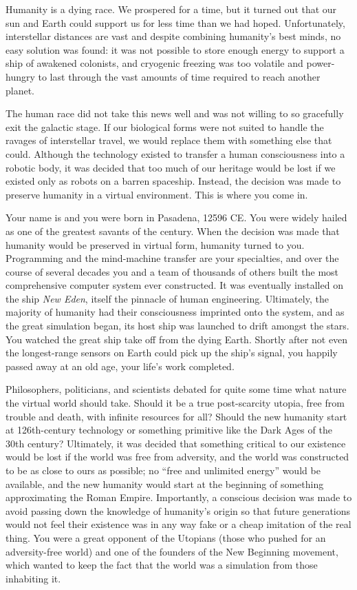 \documentclass[char]{guildcamp1}
\begin{document}
\name{\cProgrammer{}}

Humanity is a dying race. We prospered for a time, but it turned out that our sun and Earth could support us for less time than we had hoped. Unfortunately, interstellar distances are vast and despite combining humanity's best minds, no easy solution was found: it was not possible to store enough energy to support a ship of awakened colonists, and cryogenic freezing was too volatile and power-hungry to last through the vast amounts of time required to reach another planet.

The human race did not take this news well and was not willing to so gracefully exit the galactic stage. If our biological forms were not suited to handle the ravages of interstellar travel, we would replace them with something else that could. Although the technology existed to transfer a human consciousness into a robotic body, it was decided that too much of our heritage would be lost if we existed only as robots on a barren spaceship. Instead, the decision was made to preserve humanity in a virtual environment. This is where you come in.

Your name is \cProgrammer{\intro} and you were born in Pasadena, 12596 CE. You were widely hailed as one of the greatest savants of the century. When the decision was made that humanity would be preserved in virtual form, humanity turned to you. Programming and the mind-machine transfer are your specialties, and over the course of several decades you and a team of thousands of others built the most comprehensive computer system ever constructed. It was eventually installed on the ship \emph{New Eden}, itself the pinnacle of human engineering. Ultimately, the majority of humanity had their consciousness imprinted onto the system, and as the great simulation began, its host ship was launched to drift amongst the stars. You watched the great ship take off from the dying Earth. Shortly after not even the longest-range sensors on Earth could pick up the ship's signal, you happily passed away at an old age, your life's work completed.

Philosophers, politicians, and scientists debated for quite some time what nature the virtual world should take. Should it be a true post-scarcity utopia, free from trouble and death, with infinite resources for all? Should the new humanity start at 126th-century technology or something primitive like the Dark Ages of the 30th century? Ultimately,  it was decided that something critical to our existence would be lost if the world was free from adversity, and the world was constructed to be as close to ours as possible; no ``free and unlimited energy'' would be available, and the new humanity would start at the beginning of something approximating the Roman Empire. Importantly, a conscious decision was made to avoid passing down the knowledge of humanity's origin so that future generations would not feel their existence was in any way fake or a cheap imitation of the real thing. You were a great opponent of the Utopians (those who pushed for an adversity-free world) and one of the founders of the New Beginning movement, which wanted to keep the fact that the world was a simulation from those inhabiting it.
\end{document}
